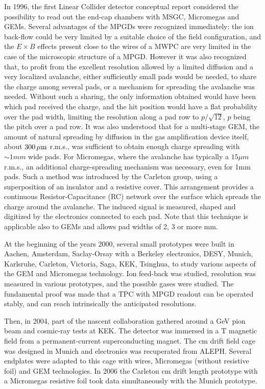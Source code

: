 In 1996, the first Linear Collider detector conceptual report \cite{TESLA-CDR} considered the possibility to read out the end-cap chambers with MSGC, Micromegas and GEMs. Several advantages of the MPGDs were recognized immediately: the ion back-flow could be very limited by a suitable choice of the field configuration, and the $E \times B$ effects present close to the wires of a MWPC are very limited in the case of the microscopic structure of a MPGD. However it was also recognized that, to profit from the
excellent resolution allowed by a limited diffusion and a very localized avalanche, either sufficiently small pads would be needed, to share the charge among several pads, or a mechanism for spreading the avalanche was needed. Without such a sharing, the only information obtained would have been which pad received the charge, and the hit position would have a flat probability over the pad width, limiting the resolution along a pad row to $p/\sqrt{12}$, $p$ being the pitch over a pad row. It was also
understood that for a multi-stage GEM, the amount of natural spreading by diffusion in the gas amplification device itself, about $\unit[300]{\mu m}$ r.m.s., was sufficient to obtain enough charge spreading with $\sim\unit{1}{mm}$ wide pads. For Micromegas, where the avalanche has typically a $\unit{15}{\mu m}$ r.m.s., an
additional charge-spreading mechanism was necessary, even for \unit{1}{mm} pads. Such a method was introduced by the Carleton group, using a superposition of an insulator and a resistive cover. This arrangement provides a continuous Resistor-Capacitance (RC) network over the surface which spreads the charge around the avalanche. The induced
signal is measured, shaped and digitized by the electronics connected to each pad. Note that this technique is applicable also to GEMs and allows pad widths of 2, 3 or more mm.

At the beginning of the years 2000, several small prototypes were built in Aachen, Amsterdam, Saclay-Orsay with a Berkeley electronics, DESY, Munich, Karlsruhe, Carleton, Victoria, Saga, KEK, Tsinghua, to study various aspects of the GEM and Micromegas technology. Ion feed-back was studied, resolution was measured in various prototypes, and the possible gases were studied. The fundamental proof was made that a TPC with MPGD readout can be operated stably, and can reach intrinsically the anticipated resolutions.

Then, in 2004, part of the nascent collaboration gathered around a \unit[5]{GeV} pion beam and cosmic-ray tests at KEK. The detector was immersed in a \unit[1]{T} magnetic field from a permanent-current superconducting magnet. The \unit[25]{cm} drift field cage was designed in Munich and electronics was recuperated from ALEPH. Several endplates were adapted to this cage with wires, Micromegas (without resistive foil) and GEM technologies. In 2006 the Carleton \unit[16]{cm} drift length prototype with a Micromegas resistive foil took data simultaneously with the Munich prototype.

